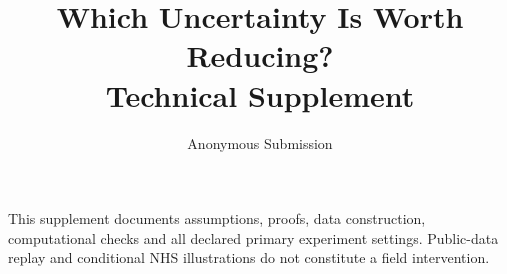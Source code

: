 \documentclass[11pt,letterpaper]{article}
\title{Which Uncertainty Is Worth Reducing?\\Technical Supplement}
\author{Anonymous Submission}
\date{}
\begin{document}
\maketitle
\noindent This supplement documents assumptions, proofs, data construction, computational checks and all declared primary experiment settings. Public-data replay and conditional NHS illustrations do not constitute a field intervention.

\appendix



\end{document}
